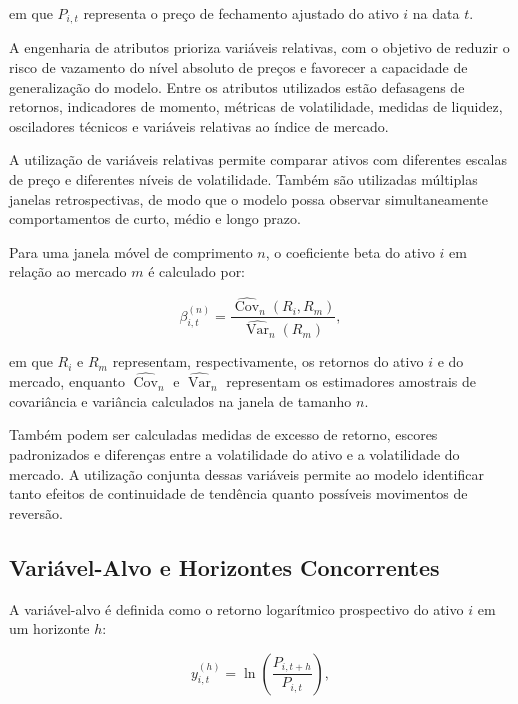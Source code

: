 em que $P_{i,t}$ representa o preço de fechamento ajustado do ativo $i$ na data $t$.

A engenharia de atributos prioriza variáveis relativas, com o objetivo de reduzir o risco de vazamento do nível absoluto de preços e favorecer a capacidade de generalização do modelo. Entre os atributos utilizados estão defasagens de retornos, indicadores de momento, métricas de volatilidade, medidas de liquidez, osciladores técnicos e variáveis relativas ao índice de mercado.

A utilização de variáveis relativas permite comparar ativos com diferentes escalas de preço e diferentes níveis de volatilidade. Também são utilizadas múltiplas janelas retrospectivas, de modo que o modelo possa observar simultaneamente comportamentos de curto, médio e longo prazo.

Para uma janela móvel de comprimento $n$, o coeficiente beta do ativo $i$ em relação ao mercado $m$ é calculado por:

\begin{equation}
    \beta_{i,t}^{(n)}
    =
    \frac{
        \widehat{\operatorname{Cov}}_{n}
        \left(
            R_i,R_m
        \right)
    }{
        \widehat{\operatorname{Var}}_{n}
        \left(
            R_m
        \right)
    },
    \label{eq:beta_rolling}
\end{equation}

em que $R_i$ e $R_m$ representam, respectivamente, os retornos do ativo $i$ e do mercado, enquanto $\widehat{\operatorname{Cov}}_{n}$ e $\widehat{\operatorname{Var}}_{n}$ representam os estimadores amostrais de covariância e variância calculados na janela de tamanho $n$.

Também podem ser calculadas medidas de excesso de retorno, escores padronizados e diferenças entre a volatilidade do ativo e a volatilidade do mercado. A utilização conjunta dessas variáveis permite ao modelo identificar tanto efeitos de continuidade de tendência quanto possíveis movimentos de reversão.

\subsection{Variável-Alvo e Horizontes Concorrentes}
\label{subsec:variavel_alvo}

A variável-alvo é definida como o retorno logarítmico prospectivo do ativo $i$ em um horizonte $h$:

\begin{equation}
    y_{i,t}^{(h)}
    =
    \ln\left(
        \frac{P_{i,t+h}}{P_{i,t}}
    \right),
    \label{eq:target_return}
\end{equation}

